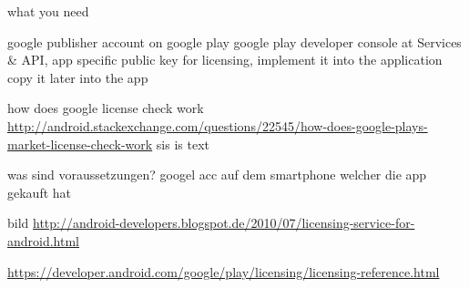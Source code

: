%
what you need

google publisher account on google play
google play developer console at Services \& API, app specific public key for licensing, implement it into the application
copy it later into the app


how does google license check work \url{http://android.stackexchange.com/questions/22545/how-does-google-plays-market-license-check-work}\newline
sis is text

was sind voraussetzungen? googel acc auf dem smartphone welcher die app gekauft hat\newline

bild \url{http://android-developers.blogspot.de/2010/07/licensing-service-for-android.html}

\url{https://developer.android.com/google/play/licensing/licensing-reference.html}
